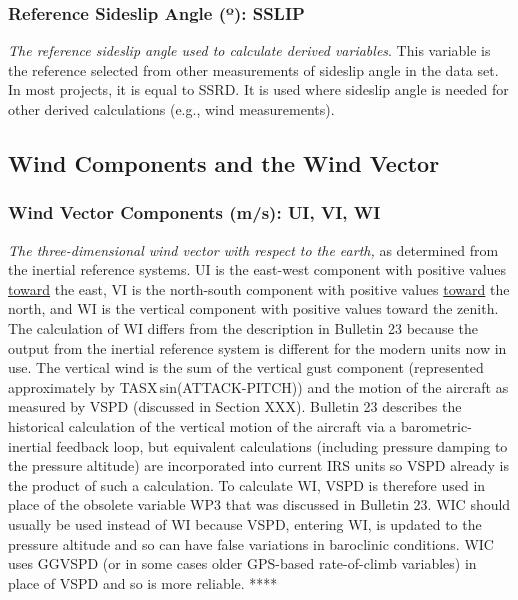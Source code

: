 \documentclass[
]{book}
\begin{document}
\hypertarget{sslip}{%
\subsubsection*{\texorpdfstring{Reference Sideslip Angle ({º}): SSLIP}{Reference Sideslip Angle (º): SSLIP}}\label{sslip}}

\emph{The reference sideslip angle used to calculate derived variables}. This variable is the reference selected from other measurements of sideslip angle in the data set. In most projects, it is equal to SSRD. It is used where sideslip angle is needed for other derived calculations (e.g., wind measurements).

\hypertarget{wind-components-and-the-wind-vector}{%
\subsection{Wind Components and the Wind Vector}\label{wind-components-and-the-wind-vector}}

\hypertarget{ui-vi-wi}{%
\subsubsection*{Wind Vector Components (m/s): UI, VI, WI}\label{ui-vi-wi}}

\emph{The three-dimensional wind vector with respect to the earth,} as determined from the inertial reference systems. UI is the east-west component with positive values \uline{toward} the east, VI is the north-south component with positive values \uline{toward} the north, and WI is the vertical component with positive values toward the zenith.
The calculation of WI differs from the description in Bulletin 23 because the output from the inertial reference system is different for the modern units now in use. The vertical wind is the sum of the vertical gust component (represented approximately by TASX sin(ATTACK-PITCH)) and the motion of the aircraft as measured by VSPD (discussed in Section XXX). Bulletin 23 describes the historical calculation of the vertical motion of the aircraft via a barometric-inertial feedback loop, but equivalent calculations (including pressure damping to the pressure altitude) are incorporated into current IRS units so VSPD already is the product of such a calculation. To calculate WI, VSPD is therefore used in place of the obsolete variable WP3 that was discussed in Bulletin 23.
WIC should usually be used instead of WI because VSPD, entering WI, is updated to the pressure altitude and so can have false variations in baroclinic conditions. WIC uses GGVSPD (or in some cases older GPS-based rate-of-climb variables) in place of VSPD and so is more reliable.
****
\end{document}
